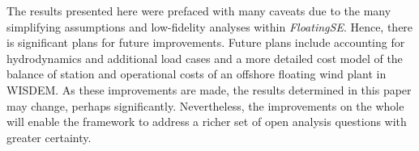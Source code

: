 The results presented here were prefaced with many caveats due to the
many simplifying assumptions and low-fidelity analyses within
\textit{FloatingSE}.  Hence, there is significant plans for future
improvements.  Future plans include accounting for hydrodynamics and
additional load cases and a more detailed cost model of the balance of
station and operational costs of an offshore floating wind plant in
WISDEM.  As these improvements are made, the results determined in this
paper may change, perhaps significantly.  Nevertheless, the improvements
on the whole will enable the framework to address a richer set of open
analysis questions with greater certainty.


